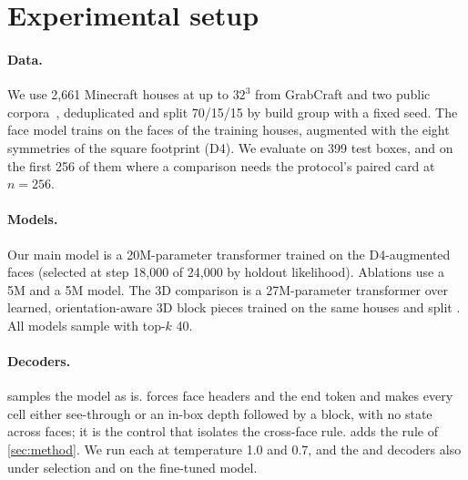 \section{Experimental setup}
\label{sec:setup}

\paragraph{Data.}
We use 2{,}661 Minecraft houses at up to $32^3$ from GrabCraft and two public corpora~\citep{chen2019voxelcnn,comino2025text2mc},
deduplicated and split 70/15/15 by build group with a fixed seed. The face model trains on the faces
of the training houses, augmented with the eight symmetries of the square footprint (D4). We evaluate
on 399 test boxes, and on the first 256 of them where a comparison needs the protocol's paired card at
$n{=}256$. 

\paragraph{Models.}
Our main model is a 20M-parameter \jointface{} transformer trained on the D4-augmented faces (selected
at step 18{,}000 of 24{,}000 by holdout likelihood). Ablations use a 5M \jointface{} and a 5M
\indepface{} model. The 3D comparison \voxelar{} is a 27M-parameter transformer over learned,
orientation-aware 3D block pieces trained on the same houses and split . All models sample with top-$k$ 40.

\paragraph{Decoders.}
\freedec{} samples the model as is. \grammar{} forces face headers and the end token and makes every
cell either see-through or an in-box depth followed by a block, with no state across faces; it is the
control that isolates the cross-face rule. \cfd{} adds the rule of \cref{sec:method}. We run each at
temperature 1.0 and 0.7, and the \grammar{} and \cfd{} decoders also under  selection and on
the fine-tuned model.

